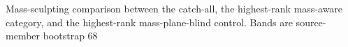 Mass-sculpting comparison between the catch-all, the highest-rank mass-aware category, and the highest-rank mass-plane-blind control. Bands are source-member bootstrap 68%
